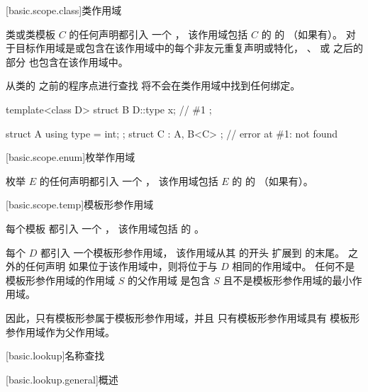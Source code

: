 [basic.scope.class]{类作用域}

\pnum
类或类模板 $C$ 的任何声明都引入
一个 ，
该作用域包括 $C$ 的  的 （如果有）。
对于目标作用域是或包含在该作用域中的每个非友元重复声明或特化，
、
 或
 之后的部分
也包含在该作用域中。
\begin{note}
从类的  之前的程序点进行查找
将不会在类作用域中找到任何绑定。
\begin{example}
\begin{codeblock}
template<class D>
struct B {
  D::type x;            // \#1
};

struct A { using type = int; };
struct C : A, B<C> {};  // error at \#1:  not found
\end{codeblock}
\end{example}
\end{note}

[basic.scope.enum]{枚举作用域}%

\pnum
枚举 $E$ 的任何声明都引入
一个 ，
该作用域包括 $E$ 的  的 （如果有）。

[basic.scope.temp]{模板形参作用域}%

\pnum
每个模板  都引入
一个 ，
该作用域包括  的 。

\pnum
每个  $D$ 都引入
一个模板形参作用域，
该作用域从其  的开头
扩展到  的末尾。
 之外的任何声明
如果位于该作用域中，则将位于与 $D$ 相同的作用域中。
任何不是模板形参作用域的作用域 $S$ 的父作用域
是包含 $S$ 且不是模板形参作用域的最小作用域。
\begin{note}
因此，只有模板形参属于模板形参作用域，并且
只有模板形参作用域具有
模板形参作用域作为父作用域。
\end{note}


[basic.lookup]{名称查找}%


[basic.lookup.general]{概述}%
%

